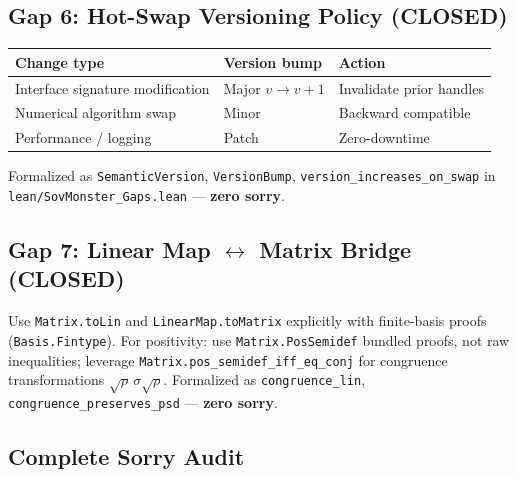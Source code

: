 \documentclass[12pt, letterpaper]{article}
\theoremstyle{plain}
\theoremstyle{definition}
\theoremstyle{remark}
\begin{document}
\subsection{Gap 6: Hot-Swap Versioning Policy (CLOSED)}

\begin{center}
\small
\renewcommand{\arraystretch}{1.4}
\begin{tabular}{@{}lll@{}}
\toprule
\textbf{Change type} & \textbf{Version bump} & \textbf{Action} \\
\midrule
Interface signature modification & Major $v \to v+1$ & Invalidate prior handles \\
Numerical algorithm swap & Minor & Backward compatible \\
Performance / logging & Patch & Zero-downtime \\
\bottomrule
\end{tabular}
\end{center}

Formalized as \texttt{SemanticVersion}, \texttt{VersionBump}, \texttt{version\_increases\_on\_swap}
in \texttt{lean/SovMonster\_Gaps.lean} — \textbf{zero sorry}.

\subsection{Gap 7: Linear Map $\leftrightarrow$ Matrix Bridge (CLOSED)}

Use \texttt{Matrix.toLin} and \texttt{LinearMap.toMatrix} explicitly with finite-basis proofs
(\texttt{Basis.Fintype}).
For positivity: use \texttt{Matrix.PosSemidef} bundled proofs, not raw inequalities;
leverage \texttt{Matrix.pos\_semidef\_iff\_eq\_conj} for congruence transformations
$\sqrt{\rho}\,\sigma\sqrt{\rho}$.
Formalized as \texttt{congruence\_lin}, \texttt{congruence\_preserves\_psd} — \textbf{zero sorry}.

\subsection{Complete Sorry Audit}
\end{document}
